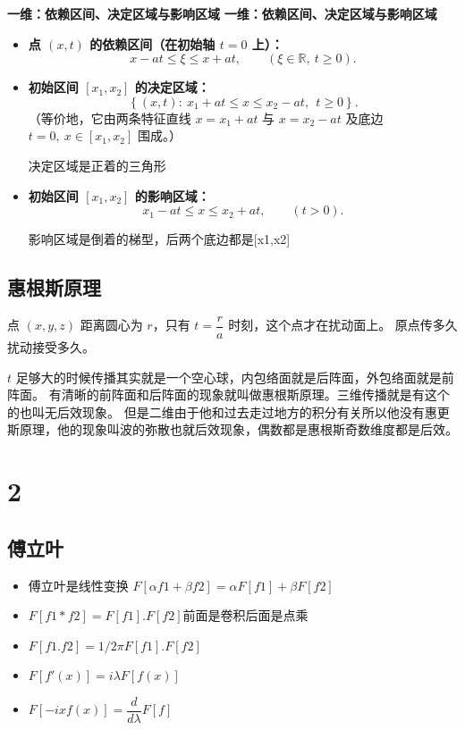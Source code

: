 \noindent\textbf{一维：依赖区间、决定区域与影响区域}
\noindent\textbf{一维：依赖区间、决定区域与影响区域}
\begin{itemize}
  \item \textbf{点 $(x,t)$ 的依赖区间（在初始轴 $t=0$ 上）：}
  \[
  x-at\le \xi \le x+at,\qquad (\xi\in\mathbb{R},\ t\ge 0).
  \]

  \item \textbf{初始区间 $[x_1,x_2]$ 的决定区域：}
  \[
  \left\{(x,t):\ x_1+at\le x\le x_2-at,\ \ t\ge 0\right\}.
  \]
  （等价地，它由两条特征直线 $x=x_1+at$ 与 $x=x_2-at$ 及底边 $t=0,\ x\in[x_1,x_2]$ 围成。）
\begin{dxtips}
    决定区域是正着的三角形
\end{dxtips}
  \item \textbf{初始区间 $[x_1,x_2]$ 的影响区域：}
  \[
  x_1-at\le x\le x_2+at,\qquad (t>0). \tag{2.21}
  \]
  \begin{dxtips}
      影响区域是倒着的梯型，后两个底边都是[x1,x2]
  \end{dxtips}
\end{itemize}
\section{惠根斯原理}
\begin{definition}[惠更斯原理]
点 $(x,y,z)$ 距离圆心为 $r$，只有 $t=\dfrac{r}{a}$ 时刻，这个点才在扰动面上。  
原点传多久扰动接受多久。

$t$ 足够大的时候传播其实就是一个空心球，内包络面就是后阵面，外包络面就是前阵面。  
有清晰的前阵面和后阵面的现象就叫做惠根斯原理。三维传播就是有这个的也叫无后效现象。  
但是二维由于他和过去走过地方的积分有关所以他没有惠更斯原理，他的现象叫波的弥散也就后效现象，偶数都是惠根斯奇数维度都是后效。
    
\end{definition}
\chapter{2}
\section{傅立叶}
\begin{itemize}
  \item 傅立叶是线性变换 \(F[αf1+βf2]=αF[f1]+βF[f2]\)
  \item \(F[f1*f2]=F[f1].F[f2]\)前面是卷积后面是点乘
  \item \(F[f1.f2]=1/2πF[f1].F[f2]\)
  \item \(F[f'(x)]=i\lambda F[f(x)]\)
  \item \(F[-ixf(x)]=\dfrac{d}{d\lambda}F[f]\)
\end{itemize}
